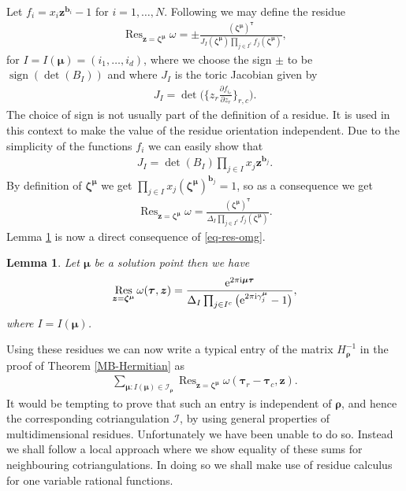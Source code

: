 \documentclass[pdftex]{sigma}
\DeclareMathOperator*{\Res}{Res}
\DeclareMathOperator*{\sign}{sign}
\numberwithin{equation}{section}
\newtheorem{Lemma}[Theorem]{Lemma}
\begin{document}
Let $f_i = x_i\bm{z}^{\bm{b}_i} - 1$ for $i=1,\dots,N$. Following \cite[p.~650]{GH78} we may define the residue
\begin{gather*}
\Res_{\bm{z} = \bm{\zeta}^{\bm\mu}} \omega = \pm \frac{(\bm{\zeta}^{\bm\mu})^{\bm{\tau}}}{J_{I}(\bm{\zeta}^{\bm\mu})\prod_{j \in I^c} f_j(\bm{\zeta}^{\bm\mu}) },
\end{gather*}
for $I = I(\bm{\mu}) = (i_1,\dots,i_d)$, where we choose the sign $\pm$ to be $\sign(\det(B_I))$
and where $J_I$ is the toric Jacobian given by
\begin{gather*}
J_I = \det\bigg(\bigg\{z_r \frac{\partial f_{i_c}}{\partial z_r}\bigg\}_{r,c}\bigg).
\end{gather*}
The choice of sign is not usually part of the definition of a residue. It is used in this context to make the value of the residue orientation independent.
Due to the simplicity of the functions $f_i$ we can easily show that
\begin{gather*}
J_I = \det(B_I) \prod_{j \in I}x_j\bm{z}^{\bm{b}_{j}}.
\end{gather*}
By definition of $\bm{\zeta}^{\bm\mu}$ we get $\prod_{j \in I}x_j(\bm{\zeta}^{\bm\mu})^{\bm{b}_{j}} = 1$, so as a consequence we get
\begin{gather}
\Res_{\bm{z} = \bm{\zeta}^{\bm\mu}} \omega =
\frac{(\bm{\zeta}^{\bm\mu})^{\bm{\tau}}}{\Delta_I
\prod_{j \in I^c} f_j(\bm{\zeta}^{\bm\mu})}.
\label{eq-res-omg}
\end{gather}
\noindent Lemma \ref{eval-res-complete} is now a direct consequence of \eqref{eq-res-omg}.

\begin{Lemma}\label{eval-res-complete}
Let $\bm\mu$ be a solution point then we have
\begin{gather*}
\Res_{\bm{z} = \bm{\zeta}^{\bm\mu}} \omega(\bm\tau,\bm{z}) = \frac{{\rm e}^{2 \pi {\rm i} \bm{\mu} \bm\tau}}{\Delta_I\prod_{j \in I^c}\big({\rm e}^{2 \pi {\rm i} \gamma^{\bm\mu}_j} - 1\big)},
\end{gather*}
where $I = I(\bm\mu)$.
\end{Lemma}


Using these residues we can now write a typical entry of the matrix
$H_{\bm\rho}^{-1}$ in the proof of Theorem \ref{MB-Hermitian} as
\begin{gather*}
\sum_{\bm\mu\colon I(\bm\mu)\in\mathcal{I}_{\bm\rho}}\Res_{\bm{z}=\bm{\zeta}^{\bm\mu}}
\omega(\bm{\tau}_r-\bm{\tau}_c,\bm{z}).
\end{gather*}
It would be tempting to prove that such an entry is independent of $\bm\rho$,
and hence the correspon\-ding cotriangulation $\mathcal{I}$, by
using general properties of multidimensional residues. Unfortunately we have
been unable to do so.
Instead we shall follow a local approach where we show equality of these sums
for neighbouring cotriangulations. In doing so we shall make use of residue
calculus for one variable rational functions.
\end{document}

